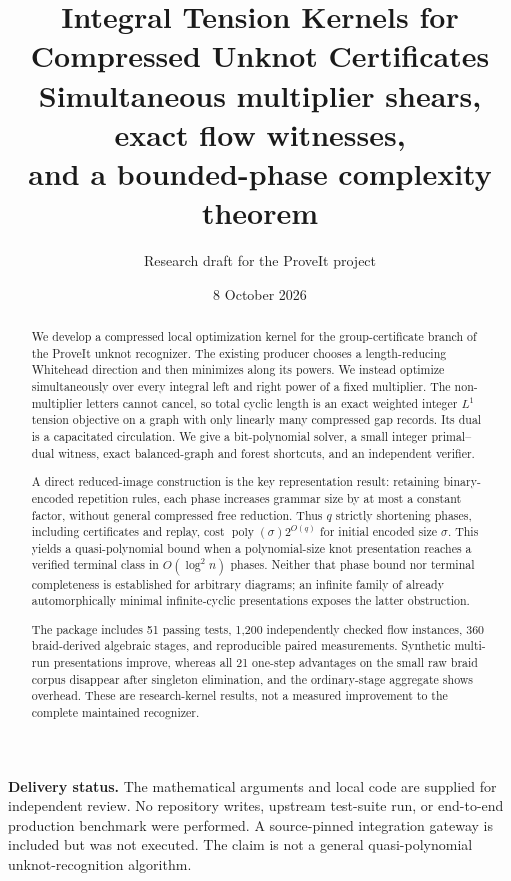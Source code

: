 \documentclass[11pt,letterpaper]{article}
\title{\textbf{Integral Tension Kernels for\\Compressed Unknot Certificates}\\[0.6em]
\large Simultaneous multiplier shears, exact flow witnesses,\\and a bounded-phase complexity theorem}
\author{Research draft for the ProveIt project}
\date{8 October 2026}
\theoremstyle{definition}
\theoremstyle{remark}\newtheorem{remark}[theorem]{Remark}
\newcommand{\poly}{\operatorname{poly}}
\begin{document}
\maketitle
\begin{abstract}
We develop a compressed local optimization kernel for the group-certificate
branch of the ProveIt unknot recognizer. The existing producer chooses a
length-reducing Whitehead direction and then minimizes along its powers.
We instead optimize simultaneously over every integral left and right power
of a fixed multiplier. The non-multiplier letters cannot cancel, so total
cyclic length is an exact weighted integer $L^1$ tension objective on a graph
with only linearly many compressed gap records. Its dual is a capacitated
circulation. We give a bit-polynomial solver, a small integer primal--dual
witness, exact balanced-graph and forest shortcuts, and an independent verifier.

A direct reduced-image construction is the key representation result: retaining
binary-encoded repetition rules, each phase increases grammar size by at most
a constant factor, without general compressed free reduction. Thus $q$
strictly shortening phases, including certificates and replay, cost
$\poly(\sigma)2^{O(q)}$ for initial encoded size $\sigma$. This yields a
quasi-polynomial bound when a polynomial-size knot presentation reaches a
verified terminal class in $O(\log^2 n)$ phases. Neither that phase bound nor
terminal completeness is established for arbitrary diagrams; an infinite
family of already automorphically minimal infinite-cyclic presentations
exposes the latter obstruction.

The package includes 51 passing tests, 1,200 independently checked flow
instances, 360 braid-derived algebraic stages, and reproducible paired
measurements. Synthetic multi-run presentations improve, whereas all 21
one-step advantages on the small raw braid corpus disappear after singleton
elimination, and the ordinary-stage aggregate shows overhead. These are
research-kernel results, not a measured improvement to the complete maintained
recognizer.
\end{abstract}
\vspace{0.5em}
\noindent\textbf{Delivery status.} The mathematical arguments and local code are
supplied for independent review. No repository writes, upstream test-suite run,
or end-to-end production benchmark were performed. A source-pinned integration
gateway is included but was not executed. The claim is not a general
quasi-polynomial unknot-recognition algorithm.
\clearpage
\tableofcontents
\clearpage
\end{document}
